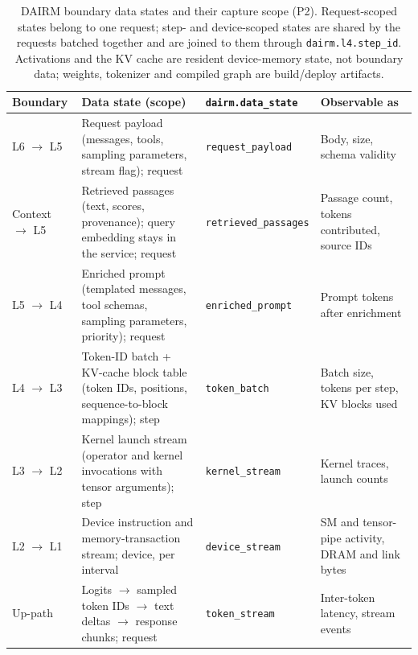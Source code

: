 \documentclass[11pt]{article}
\begin{document}
\begin{table}[!htbp]
\centering
\caption{DAIRM boundary data states and their capture scope (P2). Request-scoped states belong to one request; step- and device-scoped states are shared by the requests batched together and are joined to them through \texttt{dairm.l4.step\_id}. Activations and the KV cache are resident device-memory state, not boundary data; weights, tokenizer and compiled graph are build/deploy artifacts.}
\label{tab:states}
\footnotesize
\begin{tabularx}{\textwidth}{@{}>{\raggedright\arraybackslash}p{1.9cm}>{\raggedright\arraybackslash}p{4.3cm}>{\raggedright\arraybackslash}p{3.05cm}Y@{}}
\toprule
\textbf{Boundary} & \textbf{Data state (scope)} & \textbf{\texttt{dairm.data\_state}} & \textbf{Observable as}\\
\midrule
L6 $\rightarrow$ L5 & Request payload (messages, tools, sampling parameters, stream flag); request & \texttt{request\_payload} & Body, size, schema validity\\
Context $\rightarrow$ L5 & Retrieved passages (text, scores, provenance); query embedding stays in the service; request & \texttt{retrieved\_passages} & Passage count, tokens contributed, source IDs\\
L5 $\rightarrow$ L4 & Enriched prompt (templated messages, tool schemas, sampling parameters, priority); request & \texttt{enriched\_prompt} & Prompt tokens after enrichment\\
L4 $\rightarrow$ L3 & Token-ID batch + KV-cache block table (token IDs, positions, sequence-to-block mappings); step & \texttt{token\_batch} & Batch size, tokens per step, KV blocks used\\
L3 $\rightarrow$ L2 & Kernel launch stream (operator and kernel invocations with tensor arguments); step & \texttt{kernel\_stream} & Kernel traces, launch counts\\
L2 $\rightarrow$ L1 & Device instruction and memory-transaction stream; device, per interval & \texttt{device\_stream} & SM and tensor-pipe activity, DRAM and link bytes\\
Up-path & Logits $\rightarrow$ sampled token IDs $\rightarrow$ text deltas $\rightarrow$ response chunks; request & \texttt{token\_stream} & Inter-token latency, stream events\\
\bottomrule
\end{tabularx}
\end{table}
\end{document}
